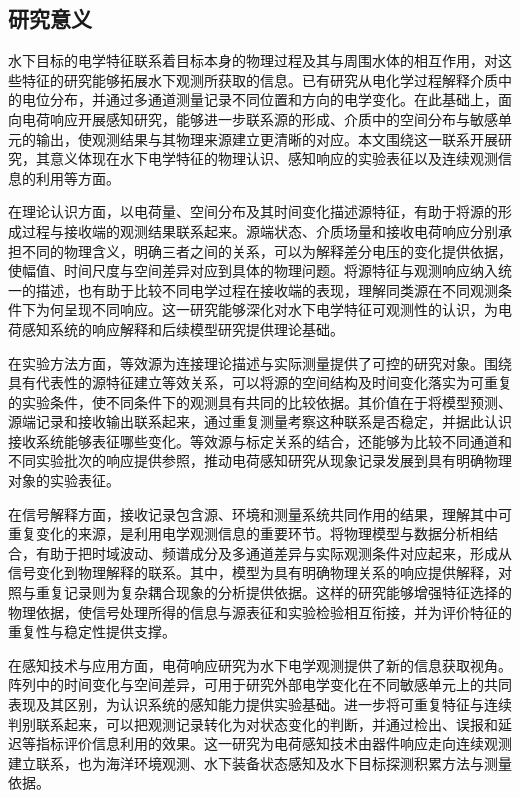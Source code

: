 \subsection{研究意义}

水下目标的电学特征联系着目标本身的物理过程及其与周围水体的相互作用，对这些特征的研究能够拓展水下观测所获取的信息。已有研究从电化学过程解释介质中的电位分布，并通过多通道测量记录不同位置和方向的电学变化\cite{thiel2020,jiang2024}。在此基础上，面向电荷响应开展感知研究，能够进一步联系源的形成、介质中的空间分布与敏感单元的输出，使观测结果与其物理来源建立更清晰的对应。本文围绕这一联系开展研究，其意义体现在水下电学特征的物理认识、感知响应的实验表征以及连续观测信息的利用等方面。

在理论认识方面，以电荷量、空间分布及其时间变化描述源特征，有助于将源的形成过程与接收端的观测结果联系起来。源端状态、介质场量和接收电荷响应分别承担不同的物理含义，明确三者之间的关系，可以为解释差分电压的变化提供依据，使幅值、时间尺度与空间差异对应到具体的物理问题。将源特征与观测响应纳入统一的描述，也有助于比较不同电学过程在接收端的表现，理解同类源在不同观测条件下为何呈现不同响应。这一研究能够深化对水下电学特征可观测性的认识，为电荷感知系统的响应解释和后续模型研究提供理论基础。

在实验方法方面，等效源为连接理论描述与实际测量提供了可控的研究对象。围绕具有代表性的源特征建立等效关系，可以将源的空间结构及时间变化落实为可重复的实验条件，使不同条件下的观测具有共同的比较依据。其价值在于将模型预测、源端记录和接收输出联系起来，通过重复测量考察这种联系是否稳定，并据此认识接收系统能够表征哪些变化。等效源与标定关系的结合，还能够为比较不同通道和不同实验批次的响应提供参照，推动电荷感知研究从现象记录发展到具有明确物理对象的实验表征。

在信号解释方面，接收记录包含源、环境和测量系统共同作用的结果，理解其中可重复变化的来源，是利用电学观测信息的重要环节。将物理模型与数据分析相结合，有助于把时域波动、频谱成分及多通道差异与实际观测条件对应起来，形成从信号变化到物理解释的联系。其中，模型为具有明确物理关系的响应提供解释，对照与重复记录则为复杂耦合现象的分析提供依据。这样的研究能够增强特征选择的物理依据，使信号处理所得的信息与源表征和实验检验相互衔接，并为评价特征的重复性与稳定性提供支撑。

在感知技术与应用方面，电荷响应研究为水下电学观测提供了新的信息获取视角。阵列中的时间变化与空间差异，可用于研究外部电学变化在不同敏感单元上的共同表现及其区别，为认识系统的感知能力提供实验基础。进一步将可重复特征与连续判别联系起来，可以把观测记录转化为对状态变化的判断，并通过检出、误报和延迟等指标评价信息利用的效果。这一研究为电荷感知技术由器件响应走向连续观测建立联系，也为海洋环境观测、水下装备状态感知及水下目标探测积累方法与测量依据。

